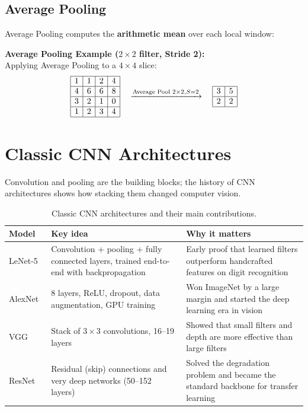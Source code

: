 \subsection{Average Pooling}
Average Pooling computes the \textbf{arithmetic mean} over each local window:

\begin{examplebox}
\textbf{Average Pooling Example ($2 \times 2$ filter, Stride 2):}\\
Applying Average Pooling to a $4 \times 4$ slice:
\[
\begin{array}{|c|c|c|c|}
\hline
1 & 1 & 2 & 4 \\ \hline
4 & 6 & 6 & 8 \\ \hline
3 & 2 & 1 & 0 \\ \hline
1 & 2 & 3 & 4 \\ \hline
\end{array}
\quad \xrightarrow{\text{Average Pool } 2 \times 2, S=2} \quad
\begin{array}{|c|c|}
\hline
3 & 5 \\ \hline
2 & 2 \\ \hline
\end{array}
\]
\end{examplebox}

\newpage
\section{Classic CNN Architectures}

Convolution and pooling are the building blocks; the history of CNN architectures shows how stacking them changed computer vision.

\begin{table}[htbp]
\centering
\small
\renewcommand{\arraystretch}{1.2}
\begin{tabular}{p{} p{} p{}}
\toprule
\textbf{Model} & \textbf{Key idea} & \textbf{Why it matters} \\
\midrule
LeNet-5~\cite{lecun1998gradient} & Convolution + pooling + fully connected layers, trained end-to-end with backpropagation & Early proof that learned filters outperform handcrafted features on digit recognition \\
AlexNet~\cite{krizhevsky2012imagenet} & 8 layers, ReLU, dropout, data augmentation, GPU training & Won ImageNet by a large margin and started the deep learning era in vision \\
VGG~\cite{simonyan2014very} & Stack of $3 \times 3$ convolutions, 16--19 layers & Showed that small filters and depth are more effective than large filters \\
ResNet~\cite{he2016deep} & Residual (skip) connections and very deep networks (50--152 layers) & Solved the degradation problem and became the standard backbone for transfer learning \\
\bottomrule
\end{tabular}
\caption{Classic CNN architectures and their main contributions.}\label{tab:cnn_architectures}
\end{table}

